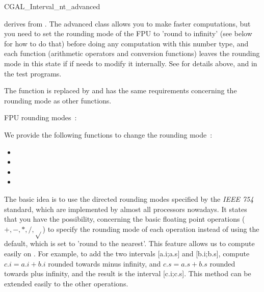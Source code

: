 \begin{ccAdvanced}

\begin{ccClass} {CGAL_Interval_nt_advanced}
\label{interval-adv}

 derives from .
The advanced class allows you to make faster computations, but you need to set
the rounding mode of the FPU to 'round to infinity' (see below for how to do
that) before doing any computation with this number type, and each function
(arithmetic operators and conversion functions)
leaves the rounding mode in this state if if needs to modify it internally.
See for details above, and in the test programs.


The function  is replaced by
 and has the same requirements concerning
the rounding mode as other functions.


FPU rounding modes~:

We provide the following functions to change the rounding mode~:
\begin{itemize}
\item {}
\item {}
\item {}
\item {}
\end{itemize}

\ccImplementation

The basic idea is to use the directed rounding modes specified by the 
{\it IEEE 754} standard, which are implemented by almost all processors 
nowadays.
It states that you have the possibility, concerning the basic floating point
operations ($+,-,*,/,\sqrt{}$) to specify the rounding mode of each operation
instead of using the default, which is set to 'round to the nearest'.
This feature allows us to compute easily on .  For example, to
add the two intervals [a.i;a.s] and [b.i;b.s], compute $c.i=a.i+b.i$ rounded
towards minus infinity, and $c.s=a.s+b.s$ rounded towards plus infinity, and
the result is the interval [c.i;c.s].  This method can be extended easily to
the other operations.


\end{ccClass}
\end{ccAdvanced}
